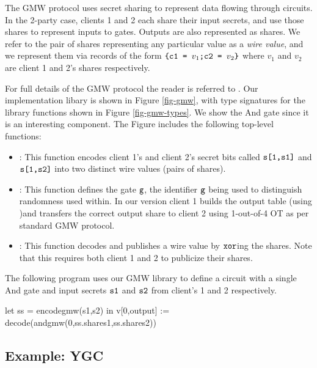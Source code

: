 The GMW protocol uses secret sharing to represent data flowing through
circuits. In the 2-party case, clients 1 and 2 each share their input
secrets, and use those shares to represent inputs to gates. Outputs
are also represented as shares. We refer to the pair of shares
representing any particular value as a \emph{wire value}, and
we represent them via records of the form
$
\texttt{\{c1 = } v_1\texttt{;c2 = } v_2\texttt{\}} 
$
where $v_1$ and $v_2$ are client 1 and 2's shares respectively.

For full details of the GMW protocol the reader is referred to
\cite{evans2018pragmatic}. Our implementation libary is shown in
Figure \ref{fig-gmw}, with type signatures for the library functions
shown in Figure \ref{fig-gmw-types}. We show the And gate since it is
an interesting component. The Figure includes the
following top-level functions:
\begin{itemize}
\item {}: This function encodes client 1's and client 2's
  secret bits called $\texttt{s[1,s1]}$ and $\texttt{s[1,s2]}$ into two
  distinct wire values (pairs of shares).
\item {}: This function defines the gate $\texttt{g}$, the
  identifier $\texttt{g}$ being used to distinguish randomness used
  within.  In our version client 1 builds the output table (using
  )and transfers the correct output share to client 2
  using 1-out-of-4 OT as per standard GMW protocol.
\item {}: This function decodes and publishes a wire value
  by $\texttt{xor}$ing the shares. Note that this requires both client 1
  and 2 to publicize their shares.
\end{itemize}
\begin{example}
  \label{example-gmw-andcircuit}
The following program uses our GMW library to define
a circuit with a single And gate and input secrets $\texttt{s1}$ and
$\texttt{s2}$ from client's 1 and 2 respectively. 
{\small
  \begin{verbatimtab}
  let ss = encodegmw(s1,s2) in v[0,output] := decode(andgmw(0,ss.shares1,ss.shares2))
  \end{verbatimtab}
}
\end{example}

\subsection{Example: YGC}
\label{section-metalang-ygc}

